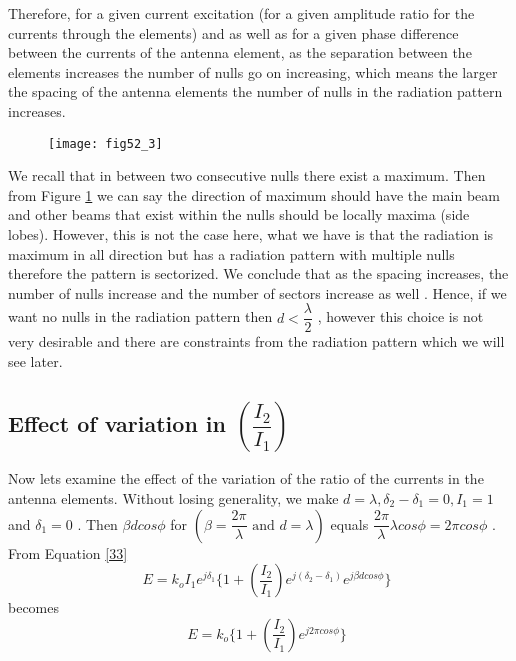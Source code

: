 Therefore, for a given current excitation (for a given amplitude ratio for the currents through the elements) and as well as for a given phase difference between the currents of the antenna element, as the separation between the elements increases the number of nulls go on increasing, which means the larger the spacing of the antenna elements the number of nulls in the radiation pattern increases.
\begin{figure}[h!]
	\texttt{[image: fig52\_3]}
	\centering
	\caption{}
	\label{52.3}
	
\end{figure}
We recall that in between two consecutive nulls there exist a maximum. Then from Figure \ref{52.3} we can say the direction of maximum should have the main beam and other beams that exist within the nulls should be locally maxima (side lobes). However, this is not the case here, what we have is that the radiation is maximum in all direction but has a radiation pattern with multiple nulls therefore the pattern is sectorized. We conclude that as the spacing increases, the number of nulls increase and the number of sectors increase as well . Hence, if we want no nulls in the radiation pattern then $ d < \dfrac{\lambda}{2} $ , however this choice is not very desirable and there are constraints from the radiation pattern which we will see later.
\subsection{Effect of variation in $ \left( \dfrac{I_2}{I_1} \right) $ } 


Now lets examine the effect of the variation of the ratio of the currents in the antenna elements. Without losing generality, we make $ d = \lambda ,  \delta_2 - \delta_1 = 0 , I_1 =1 $ and $\delta_1 = 0 $ . Then $ \beta dcos\phi $ for $ ( \beta = \dfrac{2 \pi}{\lambda} \text{ and }  d = \lambda) $ equals $ \dfrac{2 \pi}{ \lambda } \lambda cos \phi = 2 \pi cos \phi $ . From Equation \ref{33}
$$
\quad  E = k_o I_1 e^{j \delta_1} \{1 + \left( \dfrac{I_2}{I_1}\right) e^{j( \delta_2 - \delta_1)} e^{j \beta dcos\phi}\} 
$$
becomes
\begin{equation}
\quad E = k_o \{ 1 +  \left(\dfrac{I_2}{I_1}\right) e^{j 2 \pi cos\phi}  \}
\end{equation}

